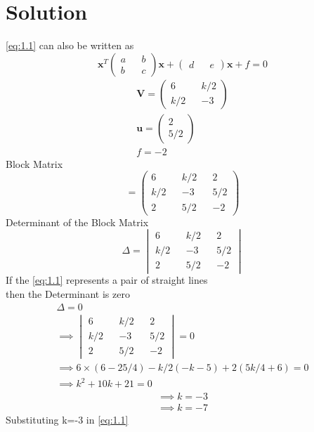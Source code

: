 \documentclass[journal,13pt,twocolumn]{IEEEtran}
\newcommand{\myvec}[1]{\ensuremath{\begin{pmatrix}#1\end{pmatrix}}}
\newcommand{\mydet}[1]{\ensuremath{\begin{vmatrix}#1\end{vmatrix}}}
\renewcommand{\vec}[1]{\mathbf{#1}}
\begin{document}
\section{\textbf{Solution}}
\eqref{eq:1.1} can also be written as 
\begin{equation}\label{eq:2.1}
\vec{x}^T \myvec{a && b \\ b && c} \vec{x} + \myvec{d && e}\vec{x} + f = 0
\end{equation}
\begin{equation}\label{eq:2.2}
\begin{split}
\vec{V}=\myvec{6 && k/2\\ k/2 && -3}\\
\vec{u}=\myvec{2\\5/2}\\
f= -2
\end{split}
\end{equation}
Block Matrix
\begin{equation} \label{eq:2.3}
 = \myvec{6 && k/2 && 2\\ k/2 && -3 && 5/2\\2 && 5/2 && -2}
\end{equation} 
Determinant of the Block Matrix
\begin{equation} \label{eq:2.4}
\Delta = \mydet{6 && k/2 && 2\\ k/2 && -3 && 5/2\\2 && 5/2 && -2}
\end{equation}
If the \eqref{eq:1.1} represents a pair of straight lines\\
then the Determinant is zero
\begin{equation} \label{eq:2.5}
\begin{split}
\Delta = 0\\
\implies \mydet{6 && k/2 && 2\\ k/2 && -3 && 5/2\\2 && 5/2 && -2} = 0\\
\implies 6\times(6-25/4)-k/2(-k-5)+2(5k/4+6) = 0\\
\implies k^2 + 10k + 21 = 0
\end{split}
\end{equation}
\begin{equation} \label{eq:2.6}
\begin{split} 
\implies \boxed{ k = -3 }\\
\implies \boxed{ k = -7 }
\end{split}
\end{equation}
Substituting k=-3 in \eqref{eq:1.1}
\end{document}

